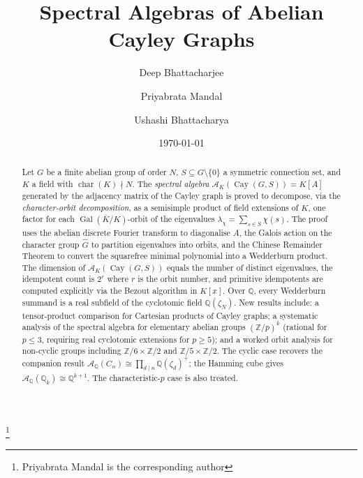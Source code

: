 \documentclass[12pt]{amsart}
\numberwithin{equation}{section}
\theoremstyle{plain}
\theoremstyle{definition}
\DeclareMathOperator{\Gal}{Gal}
\DeclareMathOperator{\ch}{char}
\DeclareMathOperator{\Cay}{Cay}
\newcommand{\Z}{\mathbb{Z}}
\newcommand{\Q}{\mathbb{Q}}
\newcommand{\calA}{\mathcal{A}}
\newcommand{\Ghat}{\widehat{G}}
\begin{document}

\title{Spectral Algebras of Abelian Cayley Graphs}

\author{Deep Bhattacharjee}
\address{Electro-Gravitational Space Propulsion Laboratory (EGSPL),
  Bhubaneswar, Odisha 751030, India}

\author{Priyabrata Mandal}
\address{Department of Mathematics, Bioinformatics and Computer Applications,
  Maulana Azad National Institute of Technology Bhopal, Bhopal 462003, India}
\thanks{Priyabrata Mandal is the corresponding author}

\author{Ushashi Bhattacharya}
\address{National Taiwan University, No.~1, Section~4, Roosevelt Road,
  Zhongzheng District, Taipei City 10617, Taiwan}

\date{\today}

\begin{abstract}
Let $G$ be a finite abelian group of order $N$, $S \subseteq G
\setminus \{0\}$ a symmetric connection set, and $K$ a field with
$\ch(K) \nmid N$.
The \emph{spectral algebra} $\calA_K(\Cay(G,S)) = K[A]$ generated by
the adjacency matrix of the Cayley graph is proved to decompose, via the
\emph{character-orbit decomposition}, as a semisimple product of field
extensions of $K$, one factor for each $\Gal(\overline{K}/K)$-orbit of the
eigenvalues $\lambda_\chi = \sum_{s \in S} \chi(s)$.
The proof uses the abelian discrete Fourier transform to diagonalise $A$,
the Galois action on the character group $\Ghat$ to partition eigenvalues
into orbits, and the Chinese Remainder Theorem to convert the squarefree
minimal polynomial into a Wedderburn product.
The dimension of $\calA_K(\Cay(G,S))$ equals the number of distinct
eigenvalues, the idempotent count is $2^r$ where $r$ is the orbit number,
and primitive idempotents are computed explicitly via the Bezout algorithm
in $K[x]$.
Over $\Q$, every Wedderburn summand is a real subfield of the cyclotomic
field $\Q(\zeta_N)$.
New results include: a tensor-product comparison for Cartesian products of
Cayley graphs; a systematic analysis of the spectral algebra for
elementary abelian groups $(\Z/p)^k$ (rational for $p \le 3$, requiring
real cyclotomic extensions for $p \ge 5$); and a worked orbit analysis for
non-cyclic groups including $\Z/6 \times \Z/2$ and $\Z/5 \times \Z/2$.
The cyclic case recovers the companion result
$\calA_\Q(C_n) \cong \prod_{d \mid n} \Q(\zeta_d)^+$; the Hamming cube
gives $\calA_\Q(\Q_k) \cong \Q^{k+1}$.
The characteristic-$p$ case is also treated.
\end{abstract}
\end{document}
